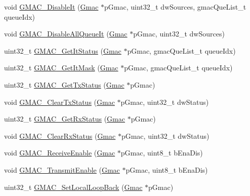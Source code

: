 \begin{DoxyCompactItemize}
\item 
void \mbox{\hyperlink{group__gmac__defines_ga6c39b23fa0f7760458941d6a5bf90669}{G\+M\+A\+C\+\_\+\+Disable\+It}} (\mbox{\hyperlink{structGmac}{Gmac}} $\ast$p\+Gmac, uint32\+\_\+t dw\+Sources, gmac\+Que\+List\+\_\+t queue\+Idx)
\item 
void \mbox{\hyperlink{group__gmac__defines_gae03425042713a644dbec300e14ea4d6d}{G\+M\+A\+C\+\_\+\+Disable\+All\+Queue\+It}} (\mbox{\hyperlink{structGmac}{Gmac}} $\ast$p\+Gmac, uint32\+\_\+t dw\+Sources)
\item 
uint32\+\_\+t \mbox{\hyperlink{group__gmac__defines_ga9e845a27fa9a4f30f4f53684ca5934c5}{G\+M\+A\+C\+\_\+\+Get\+It\+Status}} (\mbox{\hyperlink{structGmac}{Gmac}} $\ast$p\+Gmac, gmac\+Que\+List\+\_\+t queue\+Idx)
\item 
uint32\+\_\+t \mbox{\hyperlink{group__gmac__defines_ga3b19788339e3ea42396e5dac9ae4764f}{G\+M\+A\+C\+\_\+\+Get\+It\+Mask}} (\mbox{\hyperlink{structGmac}{Gmac}} $\ast$p\+Gmac, gmac\+Que\+List\+\_\+t queue\+Idx)
\item 
uint32\+\_\+t \mbox{\hyperlink{group__gmac__defines_gafba1535fac70522c3101326e020ca1d6}{G\+M\+A\+C\+\_\+\+Get\+Tx\+Status}} (\mbox{\hyperlink{structGmac}{Gmac}} $\ast$p\+Gmac)
\item 
void \mbox{\hyperlink{group__gmac__defines_ga620df07c4598d12a88be4e3715eafe7e}{G\+M\+A\+C\+\_\+\+Clear\+Tx\+Status}} (\mbox{\hyperlink{structGmac}{Gmac}} $\ast$p\+Gmac, uint32\+\_\+t dw\+Status)
\item 
uint32\+\_\+t \mbox{\hyperlink{group__gmac__defines_gacf2a7803b8177d1ec6837d76de5c5e7a}{G\+M\+A\+C\+\_\+\+Get\+Rx\+Status}} (\mbox{\hyperlink{structGmac}{Gmac}} $\ast$p\+Gmac)
\item 
void \mbox{\hyperlink{group__gmac__defines_ga409a1719b06569ad5f4efe03d21ab1dd}{G\+M\+A\+C\+\_\+\+Clear\+Rx\+Status}} (\mbox{\hyperlink{structGmac}{Gmac}} $\ast$p\+Gmac, uint32\+\_\+t dw\+Status)
\item 
void \mbox{\hyperlink{group__gmac__defines_ga3caa9d3dc5ec1e3e32e9e017702ef51e}{G\+M\+A\+C\+\_\+\+Receive\+Enable}} (\mbox{\hyperlink{structGmac}{Gmac}} $\ast$p\+Gmac, uint8\+\_\+t b\+Ena\+Dis)
\item 
void \mbox{\hyperlink{group__gmac__defines_ga43e952eb0a8ec8d8131ac69b6a30842d}{G\+M\+A\+C\+\_\+\+Transmit\+Enable}} (\mbox{\hyperlink{structGmac}{Gmac}} $\ast$p\+Gmac, uint8\+\_\+t b\+Ena\+Dis)
\item 
uint32\+\_\+t \mbox{\hyperlink{group__gmac__defines_ga3eff24454c743d2ad0c7d2e7a2a9ca84}{G\+M\+A\+C\+\_\+\+Set\+Local\+Loop\+Back}} (\mbox{\hyperlink{structGmac}{Gmac}} $\ast$p\+Gmac)

\end{DoxyCompactItemize}
